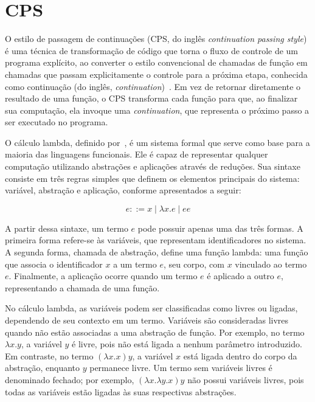 \section{CPS}\label{sec:cps}

O estilo de passagem de continuações (CPS, do inglês \textit{continuation passing style}) é uma técnica de transformação de código que torna o fluxo de controle de um programa explícito, ao converter o estilo convencional de chamadas de função em chamadas que passam explicitamente o controle para a próxima etapa, conhecida como continuação (do inglês, \textit{continuation})~\cite{appel1992compiling}.
Em vez de retornar diretamente o resultado de uma função, o CPS transforma cada função para que, ao finalizar sua computação, ela invoque uma \textit{continuation}, que representa o próximo passo a ser executado no programa.

O cálculo lambda, definido por~, é um sistema formal que serve como base para a maioria das linguagens funcionais.
Ele é capaz de representar qualquer computação utilizando abstrações e aplicações através de reduções.
Sua sintaxe consiste em três regras simples que definem os elementos principais do sistema: variável, abstração e aplicação, conforme apresentados a seguir:

\begin{equation}\label{eq:lambda-calculus}
  e ::= x \mid \lambda x. e \mid e e
\end{equation}

A partir dessa sintaxe, um termo $e$ pode possuir apenas uma das três formas.
A primeira forma refere-se às variáveis, que representam identificadores no sistema.
A segunda forma, chamada de abstração, define uma função lambda: uma função que associa o identificador $x$ a um termo $e$, seu corpo, com $x$ vinculado ao termo $e$.
Finalmente, a aplicação ocorre quando um termo $e$ é aplicado a outro $e$, representando a chamada de uma função.

No cálculo lambda, as variáveis podem ser classificadas como livres ou ligadas, dependendo de seu contexto em um termo.
Variáveis são consideradas livres quando não estão associadas a uma abstração de função.
Por exemplo, no termo $\lambda x. y$, a variável $y$ é livre, pois não está ligada a nenhum parâmetro introduzido.
Em contraste, no termo $(\lambda x. x) y$, a variável $x$ está ligada dentro do corpo da abstração, enquanto $y$ permanece livre.
Um termo sem variáveis livres é denominado fechado; por exemplo, $(\lambda x. \lambda y. x) y$ não possui variáveis livres, pois todas as variáveis estão ligadas às suas respectivas abstrações.

